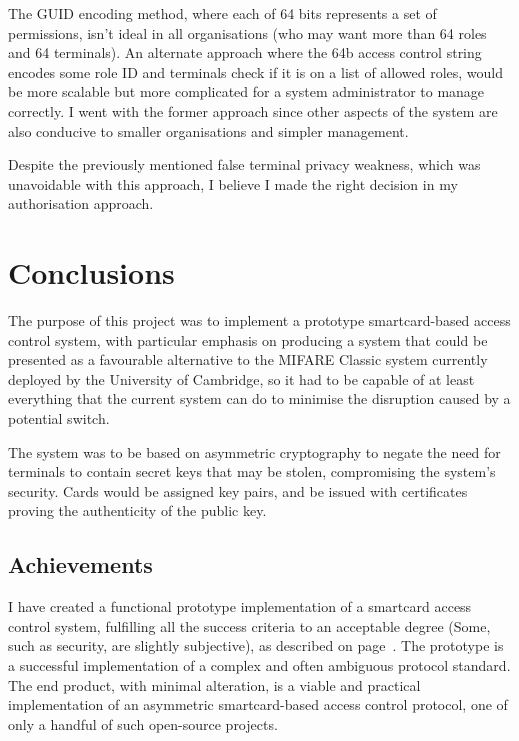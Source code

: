 \documentclass[12pt,a4paper]{article}
\begin{document}
The GUID encoding method, where each of 64 bits represents a set of permissions, isn't ideal in all organisations (who may want more than 64 roles and 64 terminals). An alternate approach where the 64b access control string encodes some role ID and terminals check if it is on a list of allowed roles, would be more scalable but more complicated for a system administrator to manage correctly. I went with the former approach since other aspects of the system are also conducive to smaller organisations and simpler management.

Despite the previously mentioned false terminal privacy weakness, which was unavoidable with this approach, I believe I made the right decision in my authorisation approach.







\pagebreak
\section{Conclusions}
The purpose of this project was to implement a prototype smartcard-based access control system, with particular emphasis on producing a system that could be presented as a favourable alternative to the MIFARE Classic system currently deployed by the University of Cambridge, so it had to be capable of at least everything that the current system can do to minimise the disruption caused by a potential switch.

The system was to be based on asymmetric cryptography to negate the need for terminals to contain secret keys that may be stolen, compromising the system's security. Cards would be assigned key pairs, and be issued with certificates proving the authenticity of the public key.



\subsection{Achievements}
I have created a functional prototype implementation of a smartcard access control system, fulfilling all the success criteria to an acceptable degree (Some, such as security, are slightly subjective), as described on page~\pageref{sec:success_criteria}. The prototype is a successful implementation of a complex and often ambiguous protocol standard. The end product, with minimal alteration, is a viable and practical implementation of an asymmetric smartcard-based access control protocol, one of only a handful of such open-source projects.
\end{document}
